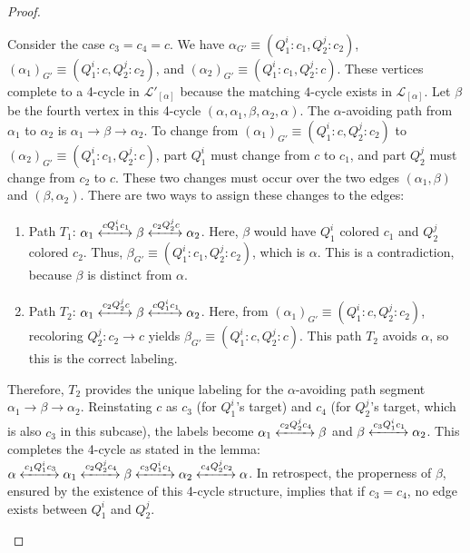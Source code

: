\documentclass[10pt,a4paper]{amsart}
\begin{document}
\begin{proof}
\begin{enumerate}
   Consider the case $c_3 = c_4 = c$. We have $\alpha_{G'} \equiv (Q^i_1\colon c_1, Q^j_2\colon c_2)$, $(\alpha_1)_{G'} \equiv (Q^i_1\colon c, Q^j_2\colon c_2)$, and $(\alpha_2)_{G'} \equiv (Q^i_1\colon c_1, Q^j_2\colon c)$. These vertices complete to a 4-cycle in $\mathcal{L}'_{[\alpha]}$ because the matching $4$-cycle exists in $\mathcal{L}_{[\alpha]}$. Let $\beta$ be the fourth vertex in this 4-cycle $(\alpha, \alpha_1, \beta, \alpha_2,\alpha)$.
    The $\alpha$-avoiding path from $\alpha_1$ to $\alpha_2$ is $\alpha_1 \to \beta \to \alpha_2$. To change from $(\alpha_1)_{G'} \equiv (Q^i_1\colon c, Q^j_2\colon c_2)$ to $(\alpha_2)_{G'} \equiv (Q^i_1\colon c_1, Q^j_2\colon c)$, part $Q^i_1$ must change from $c$ to $c_1$, and part $Q^j_2$ must change from $c_2$ to $c$.
    These two changes must occur over the two edges $(\alpha_1, \beta)$ and $(\beta, \alpha_2)$. There are two ways to assign these changes to the edges:
    \begin{enumerate}
        \item Path $T_1$: $\alpha_1 \xleftrightarrow{cQ^i_1c_1} \beta \xleftrightarrow{c_2Q^j_2c} \alpha_2$.
        Here, $\beta$ would have $Q^i_1$ colored $c_1$ and $Q^j_2$ colored $c_2$. Thus, $\beta_{G'} \equiv (Q^i_1\colon c_1, Q^j_2\colon c_2)$, which is $\alpha$. This is a contradiction, because $\beta$ is distinct from $\alpha$.
        \item Path $T_2$: $\alpha_1 \xleftrightarrow{c_2Q^j_2c} \beta \xleftrightarrow{cQ^i_1c_1} \alpha_2$.
        Here, from $(\alpha_1)_{G'} \equiv (Q^i_1\colon c, Q^j_2\colon c_2)$, recoloring $Q^j_2\colon c_2 \to c$ yields $\beta_{G'} \equiv (Q^i_1\colon c, Q^j_2\colon c)$. This path $T_2$ avoids $\alpha$, so this is the correct labeling.
    \end{enumerate}
    Therefore, $T_2$ provides the unique labeling for the $\alpha$-avoiding path segment $\alpha_1 \to \beta \to \alpha_2$. Reinstating $c$ as $c_3$ (for $Q^i_1$'s target) and $c_4$ (for $Q^j_2$'s target, which is also $c_3$ in this subcase), the labels become $\alpha_1 \xleftrightarrow{c_2Q^j_2c_4} \beta$ and $\beta \xleftrightarrow{c_3Q^i_1c_1} \alpha_2$.
    This completes the 4-cycle as stated in the lemma: $\alpha \xleftrightarrow{c_1Q^i_1c_3} \alpha_1 \xleftrightarrow{c_2Q^j_2c_4} \beta \xleftrightarrow{c_3Q^i_1c_1} \alpha_2 \xleftrightarrow{c_4Q^j_2c_2} \alpha$. In retrospect, the properness of $\beta$, ensured by the existence of this 4-cycle structure, implies that if $c_3=c_4$, no edge exists between $Q^i_1$ and $Q^j_2$. \qedhere
\end{enumerate}
\end{proof}
\end{document}

